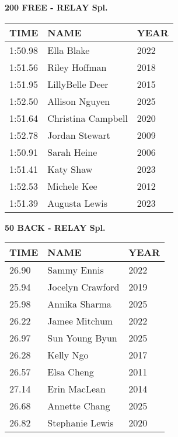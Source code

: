 \vspace{0.4cm}

\begin{center}
\begin{minipage}[t]{0.7\textwidth}
\centering
\textbf{200 FREE - RELAY Spl.}\\[0.05cm]
\begin{tabular}{@{}p{1.8cm}p{2.8cm}p{1.2cm}@{}}
\hline
\textbf{TIME} & \textbf{NAME} & \textbf{YEAR} \\
\hline
1:50.98 & Ella Blake & 2022 \\
1:51.56 & Riley Hoffman & 2018 \\
1:51.95 & LillyBelle Deer & 2015 \\
1:52.50 & Allison Nguyen & 2025 \\
1:51.64 & Christina Campbell & 2020 \\
1:52.78 & Jordan Stewart & 2009 \\
1:50.91 & Sarah Heine & 2006 \\
1:51.41 & Katy Shaw & 2023 \\
1:52.53 & Michele Kee & 2012 \\
1:51.39 & Augusta Lewis & 2023 \\
\hline
\end{tabular}
\end{minipage}
\end{center}

\vspace{0.4cm}

\begin{center}
\begin{minipage}[t]{0.7\textwidth}
\centering
\textbf{50 BACK - RELAY Spl.}\\[0.05cm]
\begin{tabular}{@{}p{1.8cm}p{2.8cm}p{1.2cm}@{}}
\hline
\textbf{TIME} & \textbf{NAME} & \textbf{YEAR} \\
\hline
26.90 & Sammy Ennis & 2022 \\
25.94 & Jocelyn Crawford & 2019 \\
25.98 & Annika Sharma & 2025 \\
26.22 & Jamee Mitchum & 2022 \\
26.97 & Sun Young Byun & 2025 \\
26.28 & Kelly Ngo & 2017 \\
26.57 & Elsa Cheng & 2011 \\
27.14 & Erin MacLean & 2014 \\
26.68 & Annette Chang & 2025 \\
26.82 & Stephanie Lewis & 2020 \\
\hline
\end{tabular}
\end{minipage}
\end{center}

